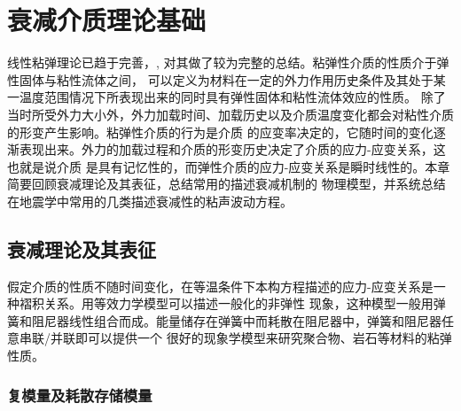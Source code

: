 
\chapter{衰减介质理论基础}

线性粘弹理论已趋于完善，, 对其做了较为完整的总结。粘弹性介质的性质介于弹性固体与粘性流体之间，
可以定义为材料在一定的外力作用历史条件及其处于某一温度范围情况下所表现出来的同时具有弹性固体和粘性流体效应的性质。
除了当时所受外力大小外，外力加载时间、加载历史以及介质温度变化都会对粘性介质的形变产生影响。粘弹性介质的行为是介质
的应变率决定的，它随时间的变化逐渐表现出来。外力的加载过程和介质的形变历史决定了介质的应力-应变关系，这也就是说介质
是具有记忆性的，而弹性介质的应力-应变关系是瞬时线性的。本章简要回顾衰减理论及其表征，总结常用的描述衰减机制的
物理模型，并系统总结在地震学中常用的几类描述衰减性的粘声波动方程。

\vspace{1.0cm}

\section{衰减理论及其表征}

假定介质的性质不随时间变化，在等温条件下本构方程描述的应力-应变关系是一种褶积关系。用等效力学模型可以描述一般化的非弹性
现象，这种模型一般用弹簧和阻尼器线性组合而成。能量储存在弹簧中而耗散在阻尼器中，弹簧和阻尼器任意串联/并联即可以提供一个
很好的现象学模型来研究聚合物、岩石等材料的粘弹性质。


\vspace{0.5cm}

\subsection{复模量及耗散存储模量}

